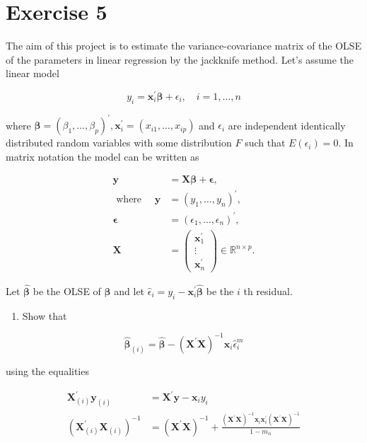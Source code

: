 \section{Exercise 5}
\label{sec:sec5}
The aim of this project is to estimate the variance-covariance matrix of the OLSE of the parameters in linear regression by the jackknife method. Let's assume the linear model

$$
y_{i}=\mathbf{x}_{i}^{\prime} \boldsymbol{\beta}+\epsilon_{i}, \quad i=1, \ldots, n
$$

where $\boldsymbol{\beta}=\left(\beta_{1}, \ldots, \beta_{p}\right)^{\prime}, \mathbf{x}_{i}^{\prime}=\left(x_{i 1}, \ldots, x_{i p}\right)$ and $\epsilon_{i}$ are independent identically distributed random variables with some distribution $F$ such that $E\left(\epsilon_{i}\right)=0$. In matrix notation the model can be written as

$$
\begin{aligned}
\mathbf{y} & =\mathbf{X} \boldsymbol{\beta}+\boldsymbol{\epsilon}, \\
\text { where } \quad \mathbf{y} & =\left(y_{1}, \ldots, y_{n}\right)^{\prime}, \\
\boldsymbol{\epsilon} & =\left(\epsilon_{1}, \ldots, \epsilon_{n}\right)^{\prime}, \\
\mathbf{X} & =\left(\begin{array}{c}
\mathbf{x}_{1}^{\prime} \\
\vdots \\
\mathbf{x}_{n}^{\prime}
\end{array}\right) \in \mathbb{R}^{n \times p} .
\end{aligned}
$$

Let $\hat{\boldsymbol{\beta}}$ be the OLSE of $\boldsymbol{\beta}$ and let $\hat{\epsilon}_{i}=y_{i}-\mathbf{x}_{i}^{\prime} \hat{\boldsymbol{\beta}}$ be the $i$ th residual.

\begin{enumerate}
  \item Show that
\end{enumerate}

$$
\hat{\boldsymbol{\beta}}_{(i)}=\hat{\boldsymbol{\beta}}-\left(\mathbf{X}^{\prime} \mathbf{X}\right)^{-1} \mathbf{x}_{i} \hat{\epsilon}_{i}^{m}
$$

using the equalities

$$
\begin{aligned}
\mathbf{X}_{(i)}^{\prime} \mathbf{y}_{(i)} & =\mathbf{X}^{\prime} \mathbf{y}-\mathbf{x}_{i} y_{i} \\
\left(\mathbf{X}_{(i)}^{\prime} \mathbf{X}_{(i)}\right)^{-1} & =\left(\mathbf{X}^{\prime} \mathbf{X}\right)^{-1}+\frac{\left(\mathbf{X}^{\prime} \mathbf{X}\right)^{-1} \mathbf{x}_{i} \mathbf{x}_{i}^{\prime}\left(\mathbf{X}^{\prime} \mathbf{X}\right)^{-1}}{1-m_{i i}}
\end{aligned}
$$

